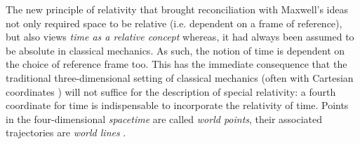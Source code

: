 The new principle of relativity that brought reconciliation with Maxwell's ideas not only required space to be relative (i.e. dependent on a frame of reference), but also views \emph{time as a relative concept} whereas, it had always been assumed to be absolute in classical mechanics. As such, the notion of time is dependent on the choice of reference frame too. This has the immediate consequence that the traditional three-dimensional setting of classical mechanics (often with Cartesian coordinates ) will not suffice for the description of special relativity: a fourth coordinate for time is indispensable to incorporate the relativity of time. Points in the four-dimensional \emph{spacetime} are called \emph{world points}, their associated trajectories are \emph{world lines} \cite{Landau1971}.

